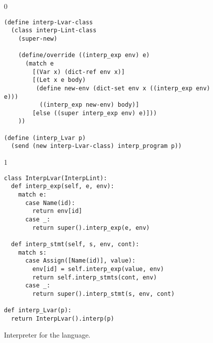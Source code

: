 \documentclass[7x10]{TimesAPriori_MIT}%
\def\racketEd{0}
\def\pythonEd{1}
\def\edition{1}
\newcommand{\pythonColor}[0]{}
\numberwithin{theorem}{chapter}
\numberwithin{definition}{chapter}
\numberwithin{equation}{chapter}
\begin{document}
\begin{figure}[tp]
\begin{tcolorbox}[colback=white]
{\if\edition\racketEd
\begin{lstlisting}
(define interp-Lvar-class
  (class interp-Lint-class
    (super-new)
    
    (define/override ((interp_exp env) e)
      (match e
        [(Var x) (dict-ref env x)]
        [(Let x e body)
         (define new-env (dict-set env x ((interp_exp env) e)))
          ((interp_exp new-env) body)]
        [else ((super interp_exp env) e)]))
    ))

(define (interp_Lvar p)
  (send (new interp-Lvar-class) interp_program p))
\end{lstlisting}
\fi}
{\if\edition\pythonEd\pythonColor
\begin{lstlisting}
class InterpLvar(InterpLint):
  def interp_exp(self, e, env):
    match e:
      case Name(id):
        return env[id]
      case _:
        return super().interp_exp(e, env)

  def interp_stmt(self, s, env, cont):
    match s:
      case Assign([Name(id)], value):
        env[id] = self.interp_exp(value, env)
        return self.interp_stmts(cont, env)
      case _:
        return super().interp_stmt(s, env, cont)

def interp_Lvar(p):
  return InterpLvar().interp(p)
\end{lstlisting}
\fi}
\end{tcolorbox}
\caption{Interpreter for the \LangVar{} language.}
\label{fig:interp-Lvar}
\end{figure}
\end{document}
